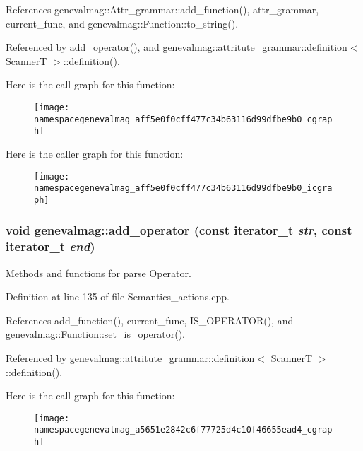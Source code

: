 References genevalmag::Attr\_\-grammar::add\_\-function(), attr\_\-grammar, current\_\-func, and genevalmag::Function::to\_\-string().



Referenced by add\_\-operator(), and genevalmag::attritute\_\-grammar::definition$<$ ScannerT $>$::definition().



Here is the call graph for this function:\nopagebreak
\begin{figure}[H]
\begin{center}
\leavevmode
\texttt{[image: namespacegenevalmag\_aff5e0f0cff477c34b63116d99dfbe9b0\_cgraph]}
\end{center}
\end{figure}




Here is the caller graph for this function:\nopagebreak
\begin{figure}[H]
\begin{center}
\leavevmode
\texttt{[image: namespacegenevalmag\_aff5e0f0cff477c34b63116d99dfbe9b0\_icgraph]}
\end{center}
\end{figure}


\hypertarget{namespacegenevalmag_a5651e2842c6f77725d4c10f46655ead4}{
\subsubsection[{add\_\-operator}]{\setlength{\rightskip}{0pt plus 5cm}void genevalmag::add\_\-operator (const iterator\_\-t {\em str}, \/  const iterator\_\-t {\em end})}}
\label{namespacegenevalmag_a5651e2842c6f77725d4c10f46655ead4}
Methods and functions for parse Operator. 

Definition at line 135 of file Semantics\_\-actions.cpp.



References add\_\-function(), current\_\-func, IS\_\-OPERATOR(), and genevalmag::Function::set\_\-is\_\-operator().



Referenced by genevalmag::attritute\_\-grammar::definition$<$ ScannerT $>$::definition().



Here is the call graph for this function:\nopagebreak
\begin{figure}[H]
\begin{center}
\leavevmode
\texttt{[image: namespacegenevalmag\_a5651e2842c6f77725d4c10f46655ead4\_cgraph]}
\end{center}
\end{figure}




